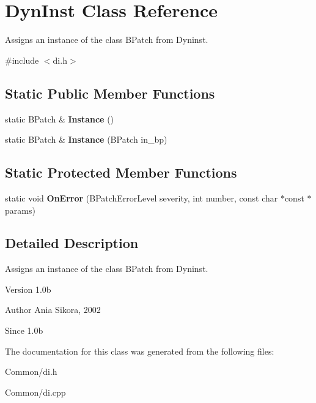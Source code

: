 \hypertarget{class_dyn_inst}{\section{Dyn\-Inst Class Reference}
\label{class_dyn_inst}
}


Assigns an instance of the class B\-Patch from Dyninst.  




{\ttfamily \#include $<$di.\-h$>$}

\subsection*{Static Public Member Functions}
\begin{DoxyCompactItemize}
\item 
\hypertarget{class_dyn_inst_abc0c0d64809758127d7bb80f3c456a63}{static B\-Patch \& {\bfseries Instance} ()}\label{class_dyn_inst_abc0c0d64809758127d7bb80f3c456a63}

\item 
\hypertarget{class_dyn_inst_a76b3ebe473728291fc999569678dcbe5}{static B\-Patch \& {\bfseries Instance} (B\-Patch in\-\_\-bp)}\label{class_dyn_inst_a76b3ebe473728291fc999569678dcbe5}

\end{DoxyCompactItemize}
\subsection*{Static Protected Member Functions}
\begin{DoxyCompactItemize}
\item 
\hypertarget{class_dyn_inst_a611dbebcb6780fa2427688ecfde8adac}{static void {\bfseries On\-Error} (B\-Patch\-Error\-Level severity, int number, const char $\ast$const $\ast$params)}\label{class_dyn_inst_a611dbebcb6780fa2427688ecfde8adac}

\end{DoxyCompactItemize}


\subsection{Detailed Description}
Assigns an instance of the class B\-Patch from Dyninst. 

\begin{DoxyVersion}{Version}
1.\-0b 
\end{DoxyVersion}
\begin{DoxyAuthor}{Author}
Ania Sikora, 2002 
\end{DoxyAuthor}
\begin{DoxySince}{Since}
1.\-0b 
\end{DoxySince}


The documentation for this class was generated from the following files\-:\begin{DoxyCompactItemize}
\item 
Common/di.\-h\item 
Common/di.\-cpp\end{DoxyCompactItemize}
